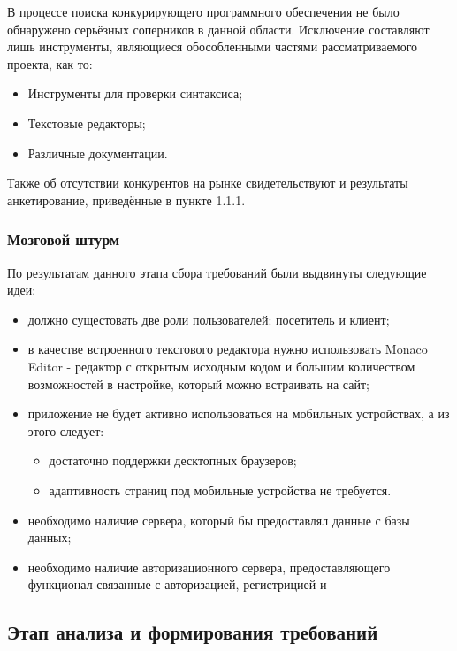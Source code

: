 В процессе поиска конкурирующего программного обеспечения не было обнаружено серьёзных соперников в данной области. Исключение составляют лишь инструменты, являющиеся обособленными частями рассматриваемого проекта, как то:

\begin{itemize}[wide]
    \item Инструменты для проверки синтаксиса;
    \item Текстовые редакторы;
    \item Различные документации.
\end{itemize}

Также об отсутствии конкурентов на рынке свидетельствуют и результаты анкетирование, приведённые в пункте 1.1.1.

\subsubsection{Мозговой штурм}

По результатам данного этапа сбора требований были выдвинуты следующие идеи:

\begin{itemize}
    \item должно сущестовать две роли пользователей: посетитель и клиент;
    \item в качестве встроенного текстового редактора нужно использовать Monaco Editor - редактор с открытым исходным кодом и большим количеством возможностей в настройке, который можно встраивать на сайт;
    \item приложение не будет активно использоваться на мобильных устройствах, а из этого следует:
    \begin{itemize}[leftmargin=2.2cm]
        \item достаточно поддержки десктопных браузеров;
        \item адаптивность страниц под мобильные устройства не требуется.
    \end{itemize}
    \item необходимо наличие сервера, который бы предоставлял данные с базы данных;
    \item необходимо наличие авторизационного сервера, предоставляющего функционал связанные с авторизацией, регистрицией и  
\end{itemize}

\subsection{Этап анализа и формирования требований}

